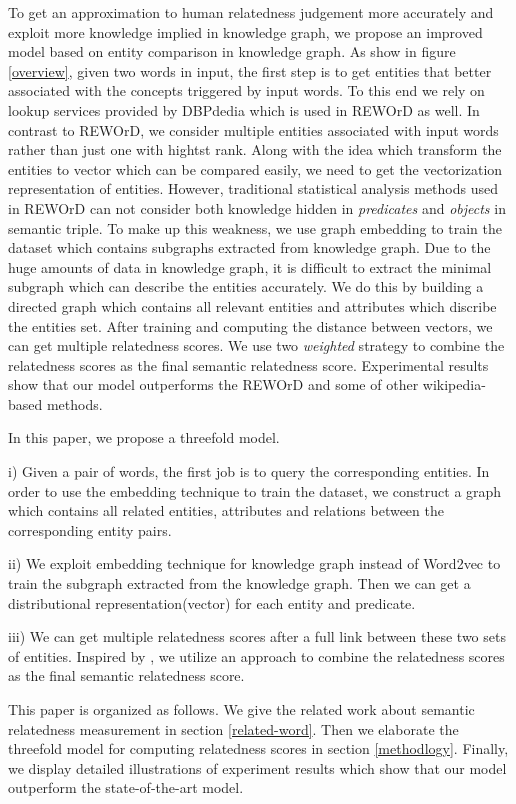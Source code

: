 To get an approximation to human relatedness judgement more accurately and exploit more knowledge implied in knowledge graph,
we propose an improved model based on entity comparison in knowledge graph. 
As show in figure \ref{overview}, given two words in input, the first step is to get entities that better associated with 
the concepts triggered by input words. To this end we rely on lookup services provided by DBPdedia which is used in REWOrD as well. 
In contrast to REWOrD, we consider multiple entities associated with input words rather than just one with hightst rank.
Along with the idea which transform the entities to vector which can be compared easily, we need to get the vectorization representation
of entities. However, traditional statistical analysis methods used in REWOrD can not consider both knowledge hidden in \emph{predicates}
and \emph{objects} in semantic triple. To make up this weakness, we use graph embedding to train the dataset which contains subgraphs
extracted from knowledge graph. Due to the huge amounts of data in knowledge graph, it is difficult to extract the minimal subgraph which
can describe the entities accurately. We do this by building a directed graph which contains all relevant entities and attributes which
discribe the entities set. After training and computing the distance between vectors, we can get multiple relatedness scores.
We use two \emph{weighted} strategy to combine the relatedness scores as the final semantic relatedness score. Experimental
results show that our model outperforms the REWOrD and some of other wikipedia-based methods.

In this paper, we propose a threefold model.

i) Given a pair of words, the first job is to query the corresponding entities. In order to use the
embedding technique to train the dataset, we construct a graph which contains all related
entities, attributes and relations between the corresponding entity pairs.

ii) We exploit embedding technique for knowledge graph instead of Word2vec to train the subgraph
extracted from the knowledge graph. Then we can get a distributional representation(vector) for each
entity and predicate.

iii) We can get multiple relatedness scores after a full link between these two sets of entities.
Inspired by \cite{acl/IacobacciPN15}, we utilize an approach to combine the relatedness scores as the final semantic relatedness score.

This paper is organized as follows. We give the related work about semantic relatedness
measurement in section \ref{related-word}. Then we elaborate the threefold model for
computing relatedness scores in section \ref{methodlogy}. Finally, we display detailed
illustrations of experiment results which show that our model outperform the state-of-the-art model.

